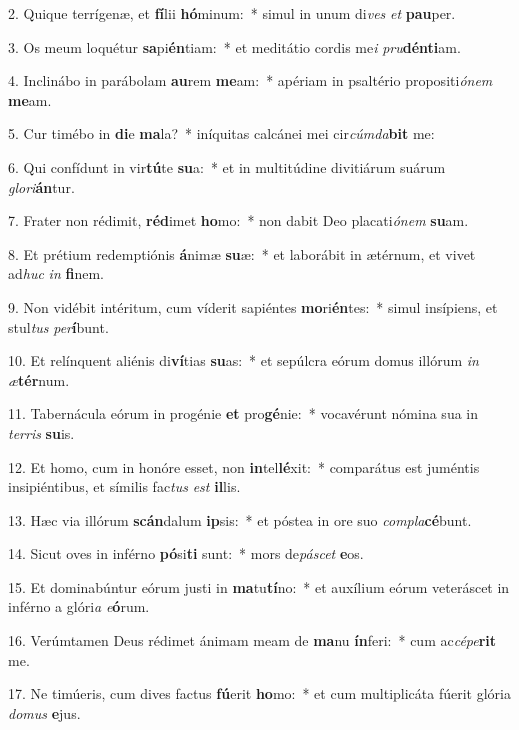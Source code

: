 2. Quique terrígenæ, et \textbf{fí}lii \textbf{hó}minum:~*  simul in unum di\textit{ves} \textit{et} \textbf{pau}per.\

3. Os meum loquétur \textbf{sa}pi\textbf{én}tiam:~*  et meditátio cordis me\textit{i} \textit{pru}\textbf{dén}\textbf{ti}am.\

4. Inclinábo in parábolam \textbf{au}rem \textbf{me}am:~*  apériam in psaltério propositi\textit{ó}\textit{nem} \textbf{me}am.\

5. Cur timébo in \textbf{di}e \textbf{ma}la?~*  iníquitas calcánei mei cir\textit{cúm}\textit{da}\textbf{bit} me:\

6. Qui confídunt in vir\textbf{tú}te \textbf{su}a:~*  et in multitúdine divitiárum suárum \textit{glo}\textit{ri}\textbf{án}tur.\

7. Frater non rédimit, \textbf{réd}imet \textbf{ho}mo:~*  non dabit Deo placati\textit{ó}\textit{nem} \textbf{su}am.\

8. Et prétium redemptiónis \textbf{á}nimæ \textbf{su}æ:~*  et laborábit in ætérnum, et vivet ad\textit{huc} \textit{in} \textbf{fi}nem.\

9. Non vidébit intéritum, cum víderit sapiéntes \textbf{mo}ri\textbf{én}tes:~*  simul insípiens, et stul\textit{tus} \textit{per}\textbf{í}bunt.\

10. Et relínquent aliénis di\textbf{ví}tias \textbf{su}as:~*  et sepúlcra eórum domus illórum \textit{in} \textit{æ}\textbf{tér}num.\

11. Tabernácula eórum in progénie \textbf{et} pro\textbf{gé}nie:~*  vocavérunt nómina sua in \textit{ter}\textit{ris} \textbf{su}is.\

12. Et homo, cum in honóre esset, non \textbf{in}tel\textbf{lé}xit:~*  comparátus est juméntis insipiéntibus, et símilis fac\textit{tus} \textit{est} \textbf{il}lis.\

13. Hæc via illórum \textbf{scán}dalum \textbf{ip}sis:~*  et póstea in ore suo \textit{com}\textit{pla}\textbf{cé}bunt.\

14. Sicut oves in inférno \textbf{pó}si\textbf{ti} sunt:~*  mors de\textit{pá}\textit{scet} \textbf{e}os.\

15. Et dominabúntur eórum justi in \textbf{ma}tu\textbf{tí}no:~*  et auxílium eórum veteráscet in inférno a glóri\textit{a} \textit{e}\textbf{ó}rum.\

16. Verúmtamen Deus rédimet ánimam meam de \textbf{ma}nu \textbf{ín}feri:~*  cum ac\textit{cé}\textit{pe}\textbf{rit} me.\

17. Ne timúeris, cum dives factus \textbf{fú}erit \textbf{ho}mo:~*  et cum multiplicáta fúerit glória \textit{do}\textit{mus} \textbf{e}jus.\

